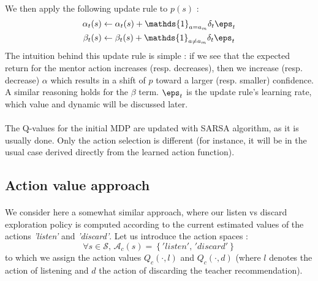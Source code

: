 \documentclass[a4paper]{report}
\begin{document}
{{{{			\paragraph{} We then apply the following update rule to $p(s)$ : 
			\begin{equation}
				\label{eq::update_rule}
				\begin{aligned}
					\alpha_t(s) &\leftarrow \alpha_t(s) +  \mathds{1}_{a=a_m}\delta_t \eps_t\\
					\beta_t(s) &\leftarrow \beta_t(s) +   \mathds{1}_{a\neq a_m}\delta_t \eps_t
				\end{aligned}
			\end{equation}
			The intuition behind this update rule is simple : if we see that the expected return for the mentor action increases (resp. decreases), then we increase (resp. decrease) $\alpha$ which results in a shift of $p$ toward a larger (resp. smaller) confidence. A similar reasoning holds for the $\beta$ term.  $\eps_t$ is the update rule's learning rate, which value and dynamic will be discussed later. 
		
			\paragraph{} The Q-values for the initial MDP are updated with SARSA algorithm, as it is usually done. Only the action selection is different (for instance, it will be in the usual case derived directly from the learned action function). 
		}
	
		\subsection{Action value approach}
		{
			\paragraph{} We consider here a somewhat similar approach, where our listen vs discard exploration policy is computed according to the current estimated values of the actions \emph{'listen'} and \emph{'discard'}. Let us introduce the action spaces : 
			\begin{equation}
				\forall s\in\mathcal{S}, \, \mathcal{A}_c(s) = \left\{ 'listen', \, 'discard'\right\}
			\end{equation}
			to which we assign the action values $Q_c(\cdot,l)$ and  $Q_c(\cdot,d)$ (where $l$ denotes the action of listening and $d$ the action of discarding the teacher recommendation). 
			
}}}}
\end{document}
